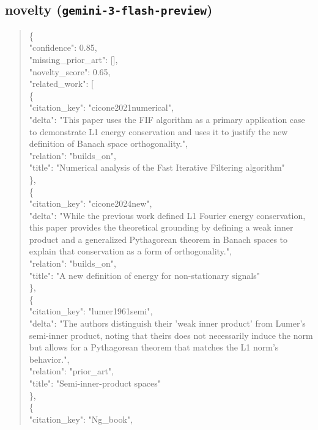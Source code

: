 \documentclass[11pt]{article}
\begin{document}
\subsection*{novelty (\texttt{gemini-3-flash-preview})}
\begin{quote}\small\ttfamily\raggedright
\{\\
  "confidence": 0.85,\\
  "missing\_prior\_art": [],\\
  "novelty\_score": 0.65,\\
  "related\_work": [\\
    \{\\
      "citation\_key": "cicone2021numerical",\\
      "delta": "This paper uses the FIF algorithm as a primary application case to demonstrate L1 energy conservation and uses it to justify the new definition of Banach space orthogonality.",\\
      "relation": "builds\_on",\\
      "title": "Numerical analysis of the Fast Iterative Filtering algorithm"\\
    \},\\
    \{\\
      "citation\_key": "cicone2024new",\\
      "delta": "While the previous work defined L1 Fourier energy conservation, this paper provides the theoretical grounding by defining a weak inner product and a generalized Pythagorean theorem in Banach spaces to explain that conservation as a form of orthogonality.",\\
      "relation": "builds\_on",\\
      "title": "A new definition of energy for non-stationary signals"\\
    \},\\
    \{\\
      "citation\_key": "lumer1961semi",\\
      "delta": "The authors distinguish their 'weak inner product' from Lumer's semi-inner product, noting that theirs does not necessarily induce the norm but allows for a Pythagorean theorem that matches the L1 norm's behavior.",\\
      "relation": "prior\_art",\\
      "title": "Semi-inner-product spaces"\\
    \},\\
    \{\\
      "citation\_key": "Ng\_book",\\

\end{quote}
\end{document}
